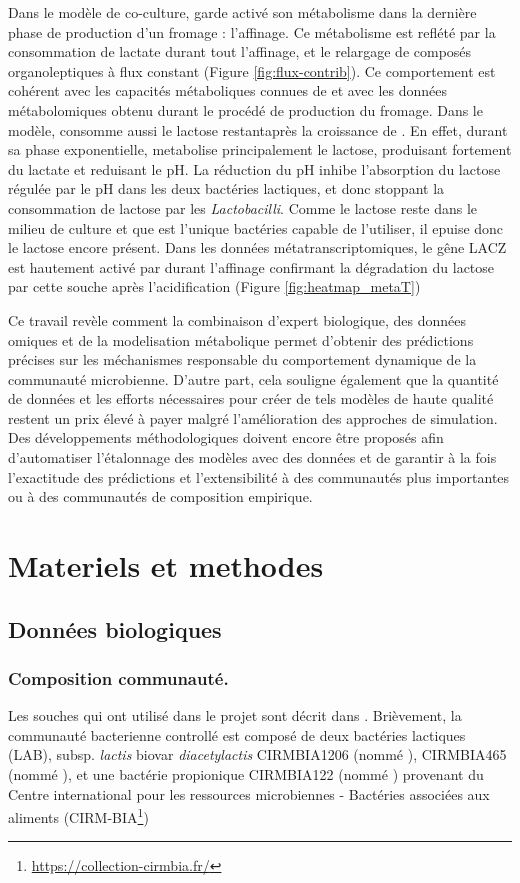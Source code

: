\documentclass[../main.tex]{subfiles}
\begin{document}
Dans le modèle de co-culture, \freud garde activé son métabolisme dans la dernière phase de production d'un fromage : l'affinage. Ce métabolisme est reflété par la consommation de lactate durant tout l'affinage, et le relargage de composés organoleptiques à flux constant (Figure \ref{fig:flux-contrib}). Ce comportement est cohérent avec les capacités métaboliques connues de \freud et avec les données métabolomiques obtenu durant le procédé de production du fromage. Dans le modèle, \freud consomme aussi le lactose restantaprès la croissance de \lactis. En effet, durant sa phase exponentielle, \lactis metabolise principalement le lactose, produisant fortement du lactate et reduisant le pH. La réduction du pH inhibe l'absorption du lactose régulée par le pH dans les deux bactéries lactiques, et donc stoppant la consommation de lactose par les \textit{Lactobacilli}. Comme le lactose reste dans le milieu de culture et que \freud est l'unique bactéries capable de l'utiliser, il epuise donc le lactose encore présent. Dans les données métatranscriptomiques, le gêne LACZ est hautement activé par \freud durant l'affinage confirmant la dégradation du lactose par cette souche après l'acidification (Figure \ref{fig:heatmap_metaT}) 

Ce travail revèle comment la combinaison d'expert biologique, des données omiques et de la modelisation métabolique permet d'obtenir des prédictions précises sur les méchanismes responsable du comportement dynamique de la communauté microbienne. D'autre part, cela souligne également que la quantité de données et les efforts nécessaires pour créer de tels modèles de haute qualité restent un prix élevé à payer malgré l'amélioration des approches de simulation. Des développements méthodologiques doivent encore être proposés afin d'automatiser l'étalonnage des modèles avec des données et de garantir à la fois l'exactitude des prédictions et l'extensibilité à des communautés plus importantes ou à des communautés de composition empirique.


\section{Materiels et methodes}

\subsection{Données biologiques}

\subsubsection{Composition communauté.} Les souches qui ont utilisé dans le projet sont décrit dans \citep{Cao2021}. Brièvement, la communauté bacterienne controllé est composé de deux bactéries lactiques (LAB), \lactis subsp. \textit{lactis} biovar \textit{diacetylactis} CIRMBIA1206 (nommé \lactis), \plantarum CIRMBIA465 (nommé \plantarum), et une bactérie propionique \freud CIRMBIA122 (nommé \freud) provenant du Centre international pour les ressources microbiennes - Bactéries associées aux aliments (CIRM-BIA\footnote{\href{https://collection-cirmbia.fr/}{https://collection-cirmbia.fr/}})
\end{document}
